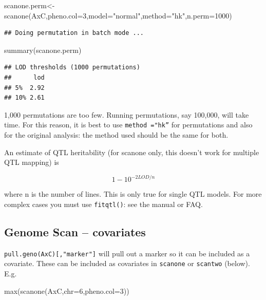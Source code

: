 \documentclass[
]{book}
\newenvironment{Shaded}{\begin{snugshade}}{\end{snugshade}}
\newcommand{\AttributeTok}[1]{\textcolor[rgb]{0.77,0.63,0.00}{#1}}
\newcommand{\DecValTok}[1]{\textcolor[rgb]{0.00,0.00,0.81}{#1}}
\newcommand{\FunctionTok}[1]{\textcolor[rgb]{0.00,0.00,0.00}{#1}}
\newcommand{\NormalTok}[1]{#1}
\newcommand{\OtherTok}[1]{\textcolor[rgb]{0.56,0.35,0.01}{#1}}
\newcommand{\StringTok}[1]{\textcolor[rgb]{0.31,0.60,0.02}{#1}}
\begin{document}
\begin{Shaded}
\begin{Highlighting}[]
\NormalTok{scanone.perm}\OtherTok{\textless{}{-}}\FunctionTok{scanone}\NormalTok{(AxC,}\AttributeTok{pheno.col=}\DecValTok{3}\NormalTok{,}\AttributeTok{model=}\StringTok{"normal"}\NormalTok{,}\AttributeTok{method=}\StringTok{"hk"}\NormalTok{,}\AttributeTok{n.perm=}\DecValTok{1000}\NormalTok{) }
\end{Highlighting}
\end{Shaded}

\begin{verbatim}
## Doing permutation in batch mode ...
\end{verbatim}

\begin{Shaded}
\begin{Highlighting}[]
\FunctionTok{summary}\NormalTok{(scanone.perm) }
\end{Highlighting}
\end{Shaded}

\begin{verbatim}
## LOD thresholds (1000 permutations)
##      lod
## 5%  2.92
## 10% 2.61
\end{verbatim}

1,000 permutations are too few. Running permutations, say 100,000, will take time. For this reason, it is best to use \texttt{method\ ="hk”} for permutations and also for the original analysis: the method used should be the same for both.

An estimate of QTL heritability (for scanone only, this doesn't work for multiple QTL mapping) is

\[1-10 ^{-2LOD/n}\]

where n is the number of lines. This is only true for single QTL models. For more complex cases you must use \texttt{fitqtl()}: see the manual or FAQ.

\hypertarget{genome-scan-covariates}{%
\subsection{Genome Scan -- covariates}\label{genome-scan-covariates}}

\texttt{pull.geno(AxC){[},"marker"{]}} will pull out a marker so it can be included as a covariate. These can be included as covariates in \texttt{scanone} or \texttt{scantwo} (below). E.g.

\begin{Shaded}
\begin{Highlighting}[]
\FunctionTok{max}\NormalTok{(}\FunctionTok{scanone}\NormalTok{(AxC,}\AttributeTok{chr=}\DecValTok{6}\NormalTok{,}\AttributeTok{pheno.col=}\DecValTok{3}\NormalTok{)) }
\end{Highlighting}
\end{Shaded}
\end{document}
